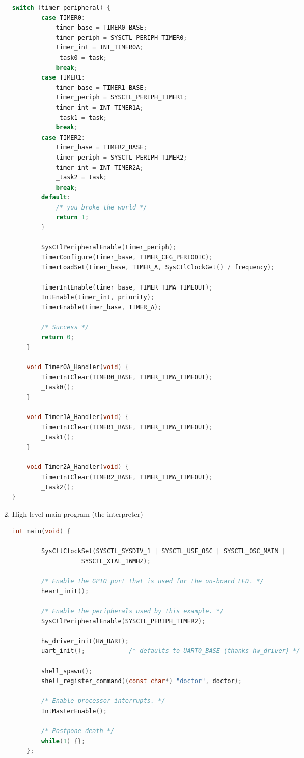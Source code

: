 \documentclass[12pt]{article}
\begin{document}
\begin{enumerate}[1)]
\begin{lstlisting}[language=C]
        switch (timer_peripheral) {
        case TIMER0:
            timer_base = TIMER0_BASE;
            timer_periph = SYSCTL_PERIPH_TIMER0;
            timer_int = INT_TIMER0A;
            _task0 = task;
            break;
        case TIMER1:
            timer_base = TIMER1_BASE;
            timer_periph = SYSCTL_PERIPH_TIMER1;
            timer_int = INT_TIMER1A;
            _task1 = task;
            break;
        case TIMER2:
            timer_base = TIMER2_BASE;
            timer_periph = SYSCTL_PERIPH_TIMER2;
            timer_int = INT_TIMER2A;
            _task2 = task;
            break;
        default:
            /* you broke the world */
            return 1;
        }

        SysCtlPeripheralEnable(timer_periph);
        TimerConfigure(timer_base, TIMER_CFG_PERIODIC);
        TimerLoadSet(timer_base, TIMER_A, SysCtlClockGet() / frequency);

        TimerIntEnable(timer_base, TIMER_TIMA_TIMEOUT);
        IntEnable(timer_int, priority);
        TimerEnable(timer_base, TIMER_A);

        /* Success */
        return 0;
    }

    void Timer0A_Handler(void) {
        TimerIntClear(TIMER0_BASE, TIMER_TIMA_TIMEOUT);
        _task0();
    }

    void Timer1A_Handler(void) {
        TimerIntClear(TIMER1_BASE, TIMER_TIMA_TIMEOUT);
        _task1();
    }

    void Timer2A_Handler(void) {
        TimerIntClear(TIMER2_BASE, TIMER_TIMA_TIMEOUT);
        _task2();
}
  \end{lstlisting}
\item High level main program (the interpreter) \\
  \begin{lstlisting}[language=C]
    int main(void) {

        SysCtlClockSet(SYSCTL_SYSDIV_1 | SYSCTL_USE_OSC | SYSCTL_OSC_MAIN |
                   SYSCTL_XTAL_16MHZ);

        /* Enable the GPIO port that is used for the on-board LED. */
        heart_init();

        /* Enable the peripherals used by this example. */
        SysCtlPeripheralEnable(SYSCTL_PERIPH_TIMER2);

        hw_driver_init(HW_UART);
        uart_init();            /* defaults to UART0_BASE (thanks hw_driver) */

        shell_spawn();
        shell_register_command((const char*) "doctor", doctor);

        /* Enable processor interrupts. */
        IntMasterEnable();

        /* Postpone death */
        while(1) {};
    };
  \end{lstlisting}
\end{enumerate}
\end{document}
